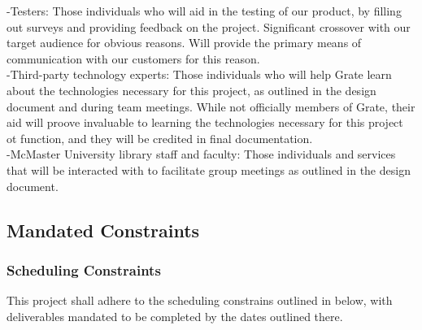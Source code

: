 \documentclass[12pt, titlepage]{article}
\begin{document}
-Testers: Those individuals who will aid in the testing of our product, by filling out surveys and providing feedback on the project. Significant crossover with our target audience for obvious reasons. Will provide the primary means of communication with our customers for this reason.\\

-Third-party technology experts: Those individuals who will help Grate learn about the technologies necessary for this project, as outlined in the design document and during team meetings. While not officially members of Grate, their aid will proove invaluable to learning the technologies necessary for this project ot function, and they will be credited in final documentation.\\

-McMaster University library staff and faculty: Those individuals and services that will be interacted with to facilitate group meetings as outlined in the design document.

\subsection{Mandated Constraints}

\subsubsection{Scheduling Constraints}

This project shall adhere to the scheduling constrains outlined in below, with deliverables mandated to be completed by the dates outlined there.
\end{document}
